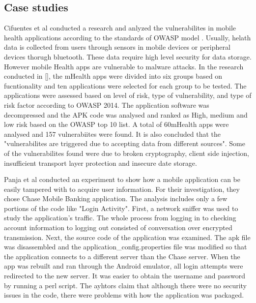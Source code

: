 \documentclass{mproj}
\begin{document}
\subsection{Case studies}
Cifuentes et al\cite{cifuentes2015} conducted a research and anlyzed the vulnerabilites in mobile health applications according to the standards of OWASP model \cite{owasp}.  Usually, helath data is collected from users through sensors in mobile devices or peripheral devices thorugh bluetooth. These data require high level security for data storage. However mobile Health apps are vulnerable to malware attacks. In the research conducted in [], the mHealth apps were divided into six groups based on fucntionality and ten applications were selected for each group to be tested. The applications were assessed based on level of risk, type of
vulnerability, and type of risk factor according to OWASP 2014. The application software was decompressed and the APK code was analysed and ranked as High, medium and low risk based on the OWASP top 10 list. A total of 60mHealth apps were analysed and 157 vulnerabiites were found. It is also concluded that the "vulnerabilites are triggered due to accepting data from different sources". Some of the vulnerabilites found were due to broken cryptography, client side injection, insufficient transport layer protection and insecure date storage.

Panja et al\cite{panja2013} conducted an experiment to show how a mobile application can be easily tampered with to acquire user information. For their investigation, they chose Chase Mobile Banking application. The analysis includes only a few portions of the code like "Login Activity". First, a network sniffer was used to study the application's traffic. The whole process from logging in to checking account information  to logging out consisted of conversation over encrypted transmission. Next, the source code of the application was examined. The apk file was disassembled and the application\_config.properties file was modified so that the application connects to a different server than the Chase server. When the app was rebuilt and ran through the Android emulator, all login attempts were redirected to the new server. It was easier to obtain the username and password by running a perl script. The ayhtors claim that although there were no security issues in the code, there were problems with how the application was packaged.

\end{document}
